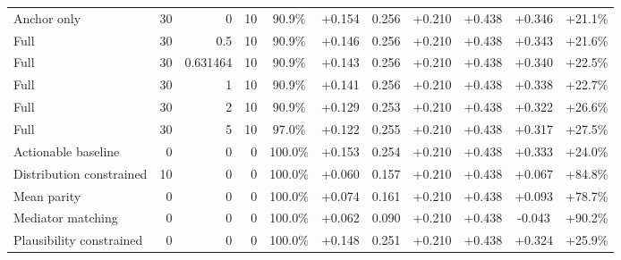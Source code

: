 \begin{table}[htbp]
\begin{tabular}{lrrrccccccc}
Anchor only & 30 & 0 & 10 & 90.9\% & +0.154 & 0.256 & +0.210 & +0.438 & +0.346 & +21.1\% \\
Full & 30 & 0.5 & 10 & 90.9\% & +0.146 & 0.256 & +0.210 & +0.438 & +0.343 & +21.6\% \\
Full & 30 & 0.631464 & 10 & 90.9\% & +0.143 & 0.256 & +0.210 & +0.438 & +0.340 & +22.5\% \\
Full & 30 & 1 & 10 & 90.9\% & +0.141 & 0.256 & +0.210 & +0.438 & +0.338 & +22.7\% \\
Full & 30 & 2 & 10 & 90.9\% & +0.129 & 0.253 & +0.210 & +0.438 & +0.322 & +26.6\% \\
Full & 30 & 5 & 10 & 97.0\% & +0.122 & 0.255 & +0.210 & +0.438 & +0.317 & +27.5\% \\
Actionable baseline & 0 & 0 & 0 & 100.0\% & +0.153 & 0.254 & +0.210 & +0.438 & +0.333 & +24.0\% \\
Distribution constrained & 10 & 0 & 0 & 100.0\% & +0.060 & 0.157 & +0.210 & +0.438 & +0.067 & +84.8\% \\
Mean parity & 0 & 0 & 0 & 100.0\% & +0.074 & 0.161 & +0.210 & +0.438 & +0.093 & +78.7\% \\
Mediator matching & 0 & 0 & 0 & 100.0\% & +0.062 & 0.090 & +0.210 & +0.438 & -0.043 & +90.2\% \\
Plausibility constrained & 0 & 0 & 0 & 100.0\% & +0.148 & 0.251 & +0.210 & +0.438 & +0.324 & +25.9\% \\
\bottomrule
\end{tabular}
\end{table}